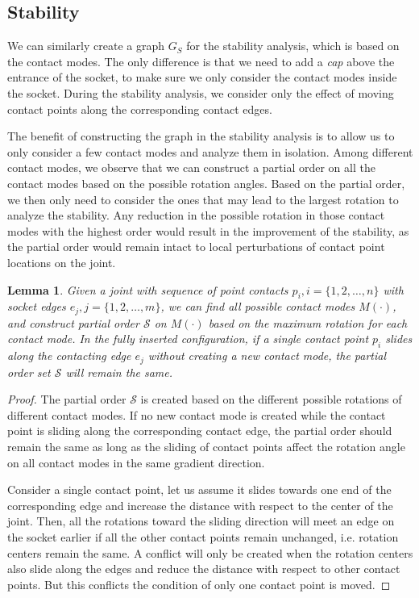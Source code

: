 \documentclass[letterpaper, 10 pt, conference]{ieeeconf}
\newtheorem{lemma}[theorem]{Lemma}
\begin{document}
\subsection{Stability}

We can similarly create a graph $G_S$ for the stability analysis, which is based on the contact modes. The only difference is that we need to add a {\em cap} above the entrance of the socket, to make sure we only consider the contact modes inside the socket. During the stability analysis, we consider only the effect of moving contact points along the corresponding contact edges. 


The benefit of constructing the graph in the stability analysis is to allow us to only consider a few contact modes and analyze them in isolation. Among different contact modes, we observe that we can construct a partial order on all the contact modes based on the possible rotation angles. Based on the partial order, we then only need to consider the ones that may lead to the largest rotation to analyze the stability. Any reduction in the possible rotation in those contact modes with the highest order would result in the improvement of the stability, as the partial order would remain intact to local perturbations of contact point locations on the joint. 


\begin{lemma}
Given a joint with sequence of point contacts $p_i, i=\{1, 2, \ldots, n\}$ with socket edges $e_j, j = \{1, 2, \ldots, m\}$, we can find all possible contact modes $M(\cdot)$, and construct partial order $\mathcal{S}$ on $M(\cdot)$ based on the maximum rotation for each contact mode. In the fully inserted configuration, if a single contact point $p_i$ slides along the contacting edge $e_j$ without creating a new contact mode, the partial order set $\mathcal{S}$ will remain the same. 
\end{lemma}

\begin{proof}
The partial order $\mathcal{S}$ is created based on the different possible rotations of different contact modes. If no new contact mode is created while the contact point is sliding along the corresponding contact edge, the partial order should remain the same as long as the sliding of contact points affect the rotation angle on all contact modes in the same gradient direction. 

Consider a single contact point, let us assume it slides towards one end of the corresponding edge and increase the distance with respect to the center of the joint. Then, all the rotations toward the sliding direction will meet an edge on the socket earlier if all the other contact points remain unchanged, i.e. rotation centers remain the same. A conflict will only be created when the rotation centers also slide along the edges and reduce the distance with respect to other contact points. But this conflicts the condition of only one contact point is moved. 
\end{proof}
\end{document}

